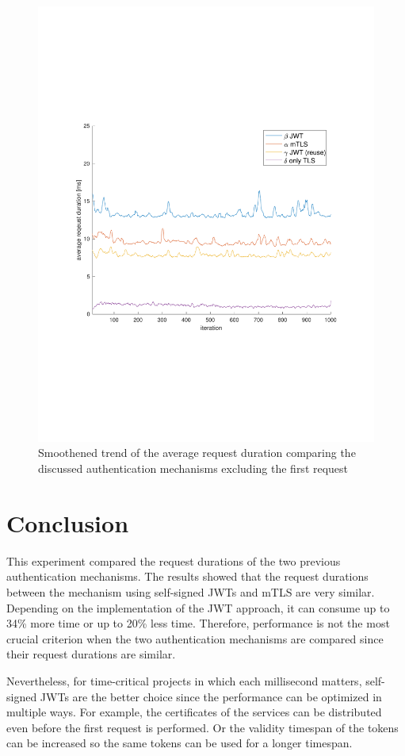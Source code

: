 \begin{figure}
	\centering
	\includegraphics[trim=0 200 0 200, clip, width=\textwidth]{images/experiment/experiment-trend.pdf}
	\caption{Smoothened trend of the average request duration comparing the discussed authentication mechanisms excluding the first request}
	\label{fig:trend}
\end{figure}

\section{Conclusion}
This experiment compared the request durations of the two previous authentication mechanisms.
The results showed that the request durations between the mechanism using self-signed JWTs and mTLS are very similar.
Depending on the implementation of the JWT approach, it can consume up to 34\% more time or up to 20\% less time.
Therefore, performance is not the most crucial criterion when the two authentication mechanisms are compared since their request durations are similar.

Nevertheless, for time-critical projects in which each millisecond matters, self-signed JWTs are the better choice since the performance can be optimized in multiple ways.
For example, the certificates of the services can be distributed even before the first request is performed.
Or the validity timespan of the tokens can be increased so the same tokens can be used for a longer timespan.
